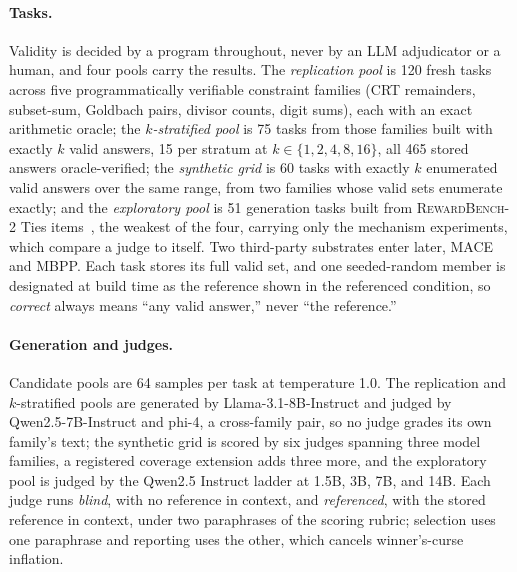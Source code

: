 \documentclass[11pt]{article}
\begin{document}
\paragraph{Tasks.}
Validity is decided by a program throughout, never by an LLM adjudicator or a human, and four pools carry the results.
The \emph{replication pool} is 120 fresh tasks across five programmatically verifiable constraint families (CRT remainders, subset-sum, Goldbach pairs, divisor counts, digit sums), each with an exact arithmetic oracle; the \emph{$k$-stratified pool} is 75 tasks from those families built with exactly $k$ valid answers, 15 per stratum at $k \in \{1,2,4,8,16\}$, all 465 stored answers oracle-verified; the \emph{synthetic grid} is 60 tasks with exactly $k$ enumerated valid answers over the same range, from two families whose valid sets enumerate exactly; and the \emph{exploratory pool} is 51 generation tasks built from \textsc{RewardBench-2} Ties items~\cite{malik2025rewardbench2}, the weakest of the four, carrying only the mechanism experiments, which compare a judge to itself.
Two third-party substrates enter later, \textsc{MACE}~\cite{mace2026} and MBPP.
Each task stores its full valid set, and one seeded-random member is designated at build time as the reference shown in the referenced condition, so \emph{correct} always means ``any valid answer,'' never ``the reference.''

\paragraph{Generation and judges.}
Candidate pools are 64 samples per task at temperature 1.0.
The replication and $k$-stratified pools are generated by Llama-3.1-8B-Instruct and judged by Qwen2.5-7B-Instruct and phi-4, a cross-family pair, so no judge grades its own family's text; the synthetic grid is scored by six judges spanning three model families, a registered coverage extension adds three more, and the exploratory pool is judged by the Qwen2.5 Instruct ladder at 1.5B, 3B, 7B, and 14B.
Each judge runs \emph{blind}, with no reference in context, and \emph{referenced}, with the stored reference in context, under two paraphrases of the scoring rubric; selection uses one paraphrase and reporting uses the other, which cancels winner's-curse inflation.
\end{document}
